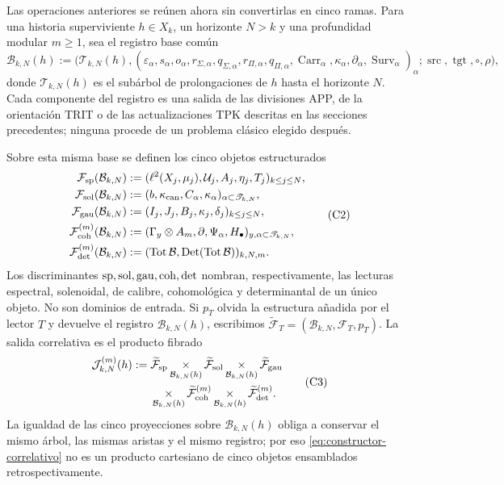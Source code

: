 Las operaciones anteriores se reúnen ahora sin convertirlas en cinco ramas.
Para una historia superviviente \(h\in X_k\), un horizonte \(N>k\) y una
profundidad modular \(m\geq1\), sea el registro base común
\[
 \mathcal B_{k,N}(h):=
 \bigl(\mathscr T_{k,N}(h),
       (\varepsilon_\alpha,s_\alpha,o_\alpha,
        r_{\Sigma,\alpha},q_{\Sigma,\alpha},
        r_{\Pi,\alpha},q_{\Pi,\alpha},
        \operatorname{Carr}_\alpha,
        \kappa_\alpha,\partial_\alpha,
        \operatorname{Surv}_\alpha)_\alpha;
       \operatorname{src},\operatorname{tgt},\circ,\rho\bigr),
 \tag{C1}
 \label{eq:base-comun-registros}
\]
donde \(\mathscr T_{k,N}(h)\) es el subárbol de prolongaciones de \(h\)
hasta el horizonte \(N\). Cada componente del registro es una salida de las
divisiones APP, de la orientación TRIT o de las actualizaciones TPK descritas
en las secciones precedentes; ninguna procede de un problema clásico elegido
después.

Sobre esta misma base se definen los cinco objetos estructurados
\[
\begin{aligned}
 \mathcal F_{\rm sp}(\mathcal B_{k,N})
   &:=(\ell^2(X_j,\mu_j),\mathcal U_j,A_j,\eta_j,T_j)_{k\leq j\leq N},\\
 \mathcal F_{\rm sol}(\mathcal B_{k,N})
   &:=(b,\kappa_{\rm can},C_\alpha,\kappa_\alpha)_{\alpha\subset\mathscr T_{k,N}},\\
 \mathcal F_{\rm gau}(\mathcal B_{k,N})
   &:=(I_j,J_j,B_j,\kappa_j,\delta_j)_{k\leq j\leq N},\\
 \mathcal F_{\rm coh}^{(m)}(\mathcal B_{k,N})
   &:=(\Gamma_y\otimes A_m,\partial,\Psi_\alpha,H_\bullet)_{y,\alpha\subset\mathscr T_{k,N}},\\
 \mathcal F_{\rm det}^{(m)}(\mathcal B_{k,N})
   &:=(\operatorname{Tot}\mathcal B,\operatorname{Det}(\operatorname{Tot}\mathcal B))_{k,N,m}.
\end{aligned}
 \tag{C2}
\]
Los discriminantes \({\rm sp},{\rm sol},{\rm gau},{\rm coh},{\rm det}\)
nombran, respectivamente, las lecturas espectral, solenoidal, de calibre,
cohomológica y determinantal de un único objeto. No son dominios de entrada.
Si \(p_T\) olvida la estructura añadida por el lector \(T\) y devuelve el
registro \(\mathcal B_{k,N}(h)\), escribimos
\(\widetilde{\mathcal F}_T=(\mathcal B_{k,N},\mathcal F_T,p_T)\). La salida
correlativa es el producto fibrado
\[
\begin{aligned}
 \mathcal J_{k,N}^{(m)}(h):={}&
 \widetilde{\mathcal F}_{\rm sp}
 \mathop{\times}_{\mathcal B_{k,N}(h)}
 \widetilde{\mathcal F}_{\rm sol}
 \mathop{\times}_{\mathcal B_{k,N}(h)}
 \widetilde{\mathcal F}_{\rm gau}\\
 &\mathop{\times}_{\mathcal B_{k,N}(h)}
 \widetilde{\mathcal F}_{\rm coh}^{(m)}
 \mathop{\times}_{\mathcal B_{k,N}(h)}
 \widetilde{\mathcal F}_{\rm det}^{(m)}.
\end{aligned}
 \tag{C3}
 \label{eq:constructor-correlativo}
\]
La igualdad de las cinco proyecciones sobre \(\mathcal B_{k,N}(h)\) obliga a
conservar el mismo árbol, las mismas aristas y el mismo registro; por eso
\eqref{eq:constructor-correlativo} no es un producto cartesiano de cinco
objetos ensamblados retrospectivamente.

